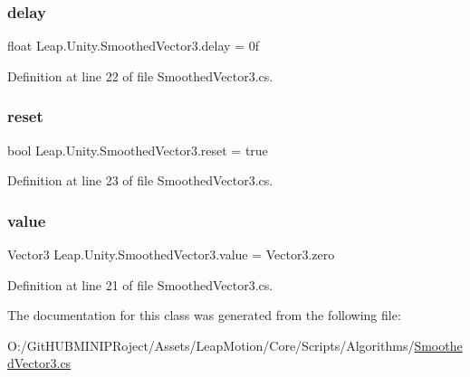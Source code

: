 \subsubsection{\texorpdfstring{delay}{delay}}
{\footnotesize\ttfamily float Leap.\+Unity.\+Smoothed\+Vector3.\+delay = 0f}



Definition at line 22 of file Smoothed\+Vector3.\+cs.

\mbox{\label{class_leap_1_1_unity_1_1_smoothed_vector3_ab37a26a80adc7f62e2aab6e5f161710b}} 
\subsubsection{\texorpdfstring{reset}{reset}}
{\footnotesize\ttfamily bool Leap.\+Unity.\+Smoothed\+Vector3.\+reset = true}



Definition at line 23 of file Smoothed\+Vector3.\+cs.

\mbox{\label{class_leap_1_1_unity_1_1_smoothed_vector3_a24c176e970afb7be19a6c3510fdb6f46}} 
\subsubsection{\texorpdfstring{value}{value}}
{\footnotesize\ttfamily Vector3 Leap.\+Unity.\+Smoothed\+Vector3.\+value = Vector3.\+zero}



Definition at line 21 of file Smoothed\+Vector3.\+cs.



The documentation for this class was generated from the following file\+:\begin{DoxyCompactItemize}
\item 
O\+:/\+Git\+H\+U\+B\+M\+I\+N\+I\+P\+Roject/\+Assets/\+Leap\+Motion/\+Core/\+Scripts/\+Algorithms/\mbox{\hyperlink{_smoothed_vector3_8cs}{Smoothed\+Vector3.\+cs}}\end{DoxyCompactItemize}
